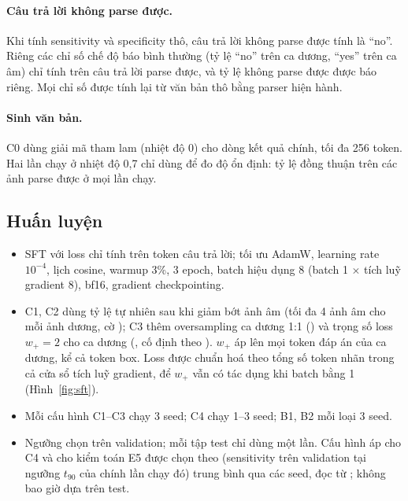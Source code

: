 \paragraph{Câu trả lời không parse được.} Khi tính sensitivity và specificity thô, câu trả lời không parse được
tính là ``no''. Riêng các chỉ số chế độ báo bình thường (tỷ lệ ``no'' trên ca dương, ``yes'' trên ca âm) chỉ tính
trên câu trả lời parse được, và tỷ lệ không parse được được báo riêng. Mọi chỉ số được tính lại từ văn bản thô bằng
parser hiện hành.

\paragraph{Sinh văn bản.} C0 dùng giải mã tham lam (nhiệt độ 0) cho dòng kết quả chính, tối đa 256 token. Hai lần
chạy ở nhiệt độ 0,7 chỉ dùng để đo độ ổn định: tỷ lệ đồng thuận trên các ảnh parse được ở mọi lần chạy.

\subsection{Huấn luyện}

\begin{itemize}
  \item SFT với loss chỉ tính trên token câu trả lời; tối ưu AdamW, learning rate $10^{-4}$, lịch cosine,
        warmup 3\%, 3 epoch, batch hiệu dụng 8 (batch 1 $\times$ tích luỹ gradient 8), bf16, gradient checkpointing.
  \item C1, C2 dùng tỷ lệ tự nhiên sau khi giảm bớt ảnh âm (tối đa 4 ảnh âm cho mỗi ảnh dương, cờ
        ); C3 thêm oversampling ca dương 1:1 () và trọng số loss $w_{+} = 2$
        cho ca dương (, cố định theo ).
        $w_{+}$ áp lên mọi token đáp án của ca dương, kể cả token box. Loss được chuẩn hoá theo tổng số token nhãn
        trong cả cửa sổ tích luỹ gradient, để $w_{+}$ vẫn có tác dụng khi batch bằng 1 (Hình~\ref{fig:sft}).
  \item Mỗi cấu hình C1--C3 chạy 3 seed; C4 chạy 1--3 seed; B1, B2 mỗi loại 3 seed.
  \item Ngưỡng chọn trên validation; mỗi tập test chỉ dùng một lần. Cấu hình áp cho C4 và cho
        kiểm toán E5 được chọn theo  (sensitivity trên validation tại ngưỡng $t_{90}$ của chính
        lần chạy đó) trung bình qua các seed, đọc từ ; không bao giờ dựa trên test.
\end{itemize}

